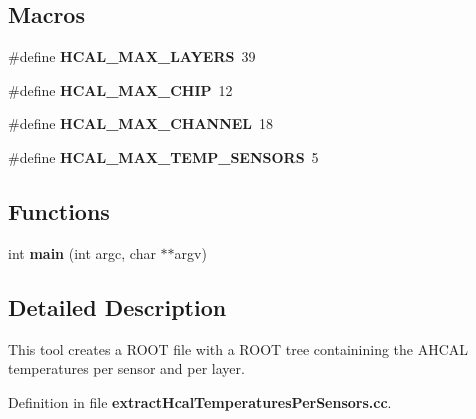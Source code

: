 \subsection*{Macros}
\begin{DoxyCompactItemize}
\item 
\#define {\bfseries H\-C\-A\-L\-\_\-\-M\-A\-X\-\_\-\-L\-A\-Y\-E\-R\-S}~39\label{extractHcalTemperaturesPerSensors_8cc_a20b17206f49806955ad85b59267112ca}

\item 
\#define {\bfseries H\-C\-A\-L\-\_\-\-M\-A\-X\-\_\-\-C\-H\-I\-P}~12\label{extractHcalTemperaturesPerSensors_8cc_ae9aff8fe25711ec20f0caf6db90ae060}

\item 
\#define {\bfseries H\-C\-A\-L\-\_\-\-M\-A\-X\-\_\-\-C\-H\-A\-N\-N\-E\-L}~18\label{extractHcalTemperaturesPerSensors_8cc_a5ce1ff92baa7e4a39bd2e8f920e1d95c}

\item 
\#define {\bfseries H\-C\-A\-L\-\_\-\-M\-A\-X\-\_\-\-T\-E\-M\-P\-\_\-\-S\-E\-N\-S\-O\-R\-S}~5\label{extractHcalTemperaturesPerSensors_8cc_a99a40167883b5c0fcc41ddf232d7220b}

\end{DoxyCompactItemize}
\subsection*{Functions}
\begin{DoxyCompactItemize}
\item 
int {\bfseries main} (int argc, char $\ast$$\ast$argv)\label{extractHcalTemperaturesPerSensors_8cc_a3c04138a5bfe5d72780bb7e82a18e627}

\end{DoxyCompactItemize}


\subsection{Detailed Description}
This tool creates a R\-O\-O\-T file with a R\-O\-O\-T tree containining the A\-H\-C\-A\-L temperatures per sensor and per layer. 

Definition in file {\bf extract\-Hcal\-Temperatures\-Per\-Sensors.\-cc}.

